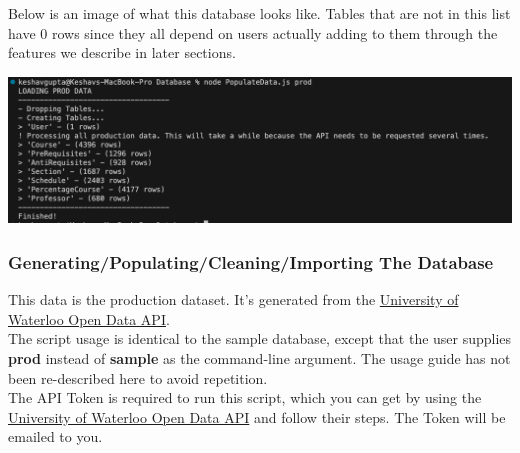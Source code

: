 \documentclass[12pt, a4paper]{article}
\begin{document}
Below is an image of what this database looks like. Tables that are not in this list have 0 rows since they all depend on users actually adding to them through the features we describe in later sections.
\begin{center}
    \includegraphics[width=\textwidth]{proddata}
\end{center}
\subsubsection*{Generating/Populating/Cleaning/Importing The Database}
This data is the production dataset. It's generated from the \href{https://openapi.data.uwaterloo.ca/api-docs/index.html}{University of Waterloo Open Data API}.\\

The script usage is identical to the sample database, except that the user supplies \textbf{prod} instead of \textbf{sample} as the command-line argument. The usage guide has not been re-described here to avoid repetition.\\

The API Token is required to run this script, which you can get by using the \href{https://openapi.data.uwaterloo.ca/api-docs/index.html}{University of Waterloo Open Data API} and follow their steps. The Token will be emailed to you.\\
\end{document}
